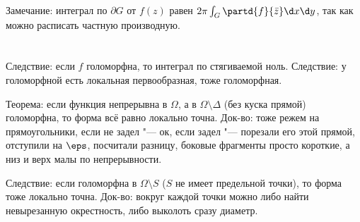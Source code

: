 	Замечание: интеграл по $\partial G$ от $f(z)$ равен $2\pi\int_G\partd{f}{\bar z}\d x\d y$,
	так как можно расписать частную производную.

\section{} %
	Следствие: если $f$ голоморфна, то интеграл по стягиваемой ноль.
	Следствие: у голоморфной есть локальная первообразная, тоже голоморфная.

	Теорема: если функция непрерывна в $\Omega$, а в $\Omega\setminus\Delta$ (без куска прямой)
	голоморфна, то форма всё равно локально точна.
	Док-во: тоже режем на прямоугольники, если не задел "--- ок, если задел "--- порезали
	его этой прямой, отступили на $\eps$, посчитали разницу, боковые фрагменты просто короткие,
	а низ и верх малы по непрерывности.

	Следствие: если голоморфна в $\Omega\setminus S$ ($S$ не имеет предельной точки), то форма тоже локально точна.
	Док-во: вокруг каждой точки можно либо найти невырезанную окрестность, либо выколоть сразу диаметр.

